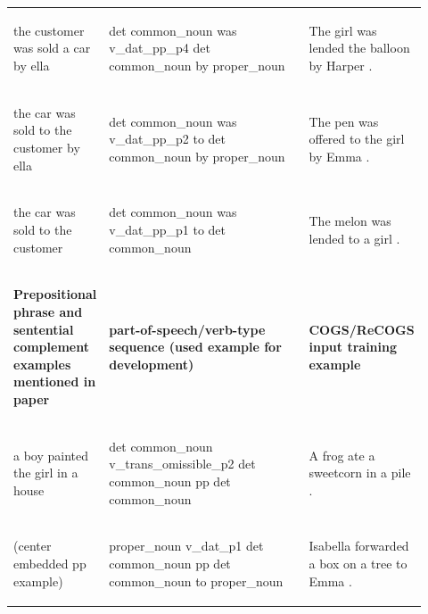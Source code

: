 \documentclass[11pt]{article}
\begin{document}
\begin{table}
\begin{tabular}{p{0.2\linewidth} p{0.52\linewidth} p{0.2\linewidth}}
\begin{small}the customer was sold a car by ella\end{small} & \begin{small}det common\_noun was v\_dat\_pp\_p4 det common\_noun by proper\_noun \end{small} & \begin{small}The girl was lended the balloon by Harper .\end{small} \\
\begin{small}the car was sold to the customer by ella\end{small} & \begin{small}det common\_noun was v\_dat\_pp\_p2 to det common\_noun by proper\_noun \end{small} & \begin{small}The pen was offered to the girl by Emma .\end{small} \\
\begin{small}the car was sold to the customer\end{small} & \begin{small}det common\_noun was v\_dat\_pp\_p1 to det common\_noun \end{small} & \begin{small}The melon was lended to a girl .\end{small} \\
\hline
\begin{small}\textbf{Prepositional phrase and sentential complement examples mentioned in paper}\end{small} & \begin{small}\textbf{part-of-speech/verb-type sequence (used example for development)}\end{small} & \begin{small}\textbf{COGS/ReCOGS input training example}\end{small} \\
\hline
\begin{small}a boy painted the girl in a house\end{small} & \begin{small}det common\_noun v\_trans\_omissible\_p2 det common\_noun pp det common\_noun\end{small} & \begin{small}A frog ate a sweetcorn in a pile .\end{small} \\
\begin{small}(center embedded pp example)\end{small} & \begin{small}proper\_noun v\_dat\_p1 det common\_noun pp det common\_noun to proper\_noun\end{small} & \begin{small}Isabella forwarded a box on a tree to Emma .\end{small} \\

\end{tabular}
\end{table}
\end{document}
